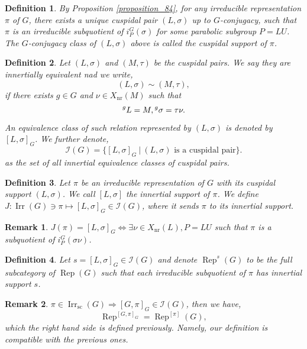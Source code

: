 \documentclass[8pt]{article}
\newtheorem{definition}{Definition}[section]
\newtheorem{remark}{Remark}[section]
\DeclareMathOperator{\Rep}{Rep}
\DeclareMathOperator{\supcus}{sc}
\DeclareMathOperator{\Irr}{Irr}
\DeclareMathOperator{\nr}{nr}
\newcommand{\sep}[0]{\:|\:}
\begin{document}
\begin{definition}
  By Proposition \ref{proposition_84}, for any irreducible representation $\pi$ of $G$, there exists a unique cuspidal pair $(L,\sigma)$ up to $G$-conjugacy, such that $\pi$ is an irreducible subquotient of $i_P^G(\sigma)$ for some parabolic subgroup $P=LU$.
  The $G$-conjugacy class of $(L,\sigma)$ above is called the cuspidal support of $\pi$.
\end{definition}

\begin{definition}
  Let $(L,\sigma)$ and $(M,\tau)$ be the cuspidal pairs. We say they are innertially equivalent nad we write, 
  \begin{equation*}
    (L,\sigma)\sim(M,\tau),
  \end{equation*}
  if there exists $g\in G$ and $\nu\in X_{\nr}(M)$ such that 
  \begin{equation*}
    \prescript{g}{}{L} = M, \prescript{g}{}{\sigma} = \tau\nu.
  \end{equation*}
  An equivalence class of such relation represented by $(L,\sigma)$ is denoted by $[L,\sigma]_G$. We further denote,
  \begin{equation*}
    \mathcal{I}(G) = \{[L,\sigma]_G\sep (L,\sigma)\text{ is a cuspidal pair}\}.
  \end{equation*}
  as the set of all innertial equivalence classes of cuspidal pairs. 
\end{definition}

\begin{definition}
  Let $\pi$ be an irreducible representation of $G$ with its cuspidal support $(L,\sigma)$. We call $[L,\sigma]$ the innertial support of $\pi$.
  We define $J:\Irr(G)\ni\pi\mapsto [L,\sigma]_G\in\mathcal{I}(G)$, where it sends $\pi$ to its innertial support.
\end{definition}

\begin{remark}
  $J(\pi) = [L,\sigma]_G\Leftrightarrow \exists \nu\in X_{\nr}(L), P= LU$ such that $\pi$ is a subquotient of $i_P^G(\sigma\nu)$.
\end{remark}

\begin{definition}
  Let $s=[L,\sigma]_G\in\mathcal{I}(G)$ and denote $\Rep^s(G)$ to be the full subcategory of $\Rep(G)$ such that each irreducible subquotient of $\pi$ has innertial support $s$.
\end{definition}

\begin{remark}
  $\pi\in\Irr_{\supcus}(G)\Rightarrow [G,\pi]_G\in\mathcal{I}(G)$, then we have,
  \begin{equation*}
    \Rep^{[G,\pi]_G}=\Rep^{[\pi]}(G),
  \end{equation*}
  which the right hand side is defined previously. Namely, our definition is compatible with the previous ones.
\end{remark}
\end{document}
